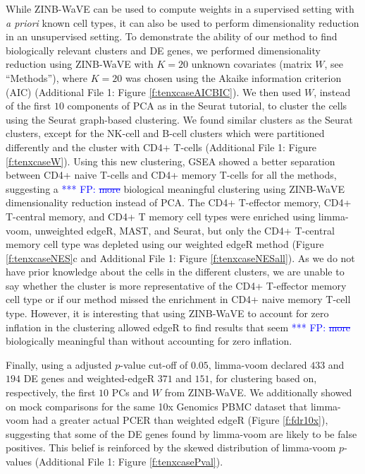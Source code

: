 \documentclass{bmcart}
\newcommand{\RPack}[1]{\textsf{#1}}
\newcommand{\fanny}[1]{\textcolor{blue}{*** FP: #1}}
\begin{document}
While ZINB-WaVE can be used to compute weights in a supervised setting with \textit{a priori} known cell types, it can also be used to perform dimensionality reduction in an unsupervised setting. To demonstrate the ability of our method to find biologically relevant clusters and DE genes, we performed dimensionality reduction using ZINB-WaVE with $K=20$ unknown covariates (matrix $W$, see ``Methods''), where $K=20$ was chosen using the Akaike information criterion (AIC) (Additional File 1: Figure \ref{f:tenxcaseAICBIC}). We then used $W$, instead of the first $10$ components of PCA as in the \RPack{Seurat} tutorial, to cluster the cells using the \RPack{Seurat} graph-based clustering. We found similar clusters as the \RPack{Seurat} clusters, except for the NK-cell and B-cell clusters which were partitioned differently and the cluster with CD4+ T-cells (Additional File 1: Figure \ref{f:tenxcaseW}). Using this new clustering, GSEA showed a better separation between CD4+ naive T-cells and CD4+ memory T-cells for all the methods, suggesting a \fanny{\sout{more}} biological meaningful clustering using ZINB-WaVE dimensionality reduction instead of PCA. The CD4+ T-effector memory, CD4+ T-central memory, and CD4+ T memory cell types were enriched using limma-voom, unweighted \RPack{edgeR}, \RPack{MAST}, and \RPack{Seurat}, but only the CD4+ T-central memory cell type was depleted using our weighted \RPack{edgeR} method (Figure \ref{f:tenxcaseNES}c and Additional File 1: Figure \ref{f:tenxcaseNESall}). As we do not have prior knowledge about the cells in the different clusters, we are unable to say whether the cluster is more representative of the CD4+ T-effector memory cell type or if our method missed the enrichment in CD4+ naive memory T-cell type. However, it is interesting that using ZINB-WaVE to account for zero inflation in the clustering allowed \RPack{edgeR} to find results that seem \fanny{\sout{more}} biologically meaningful than without accounting for zero inflation.

Finally, using a \citet{Benjamini1995} adjusted $p$-value cut-off of $0.05$, limma-voom declared $433$ and $194$ DE genes and weighted-edgeR $371$ and $151$, for clustering based on, respectively, the first $10$ PCs and $W$ from ZINB-WaVE. We additionally showed on mock comparisons for the same 10x Genomics PBMC dataset that limma-voom had a greater actual PCER than weighted \RPack{edgeR} (Figure \ref{f:fdr10x}), suggesting that some of the DE genes found by limma-voom are likely to be false positives. This belief is reinforced by the skewed distribution of limma-voom $p$-values (Additional File 1: Figure \ref{f:tenxcasePval}).
\end{document}
